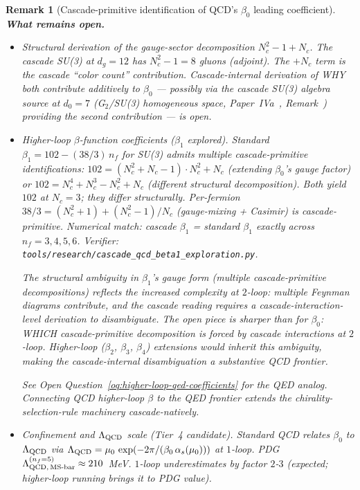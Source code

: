 \documentclass[12pt,a4paper]{article}
\newtheorem*{remark}{Remark}
\begin{document}
\begin{remark}[Cascade-primitive identification of QCD's $\beta_0$ leading coefficient]
\medskip\noindent\textbf{What remains open.}
\begin{itemize}[nosep]
\item \emph{Structural derivation of the gauge-sector decomposition
$N_c^2 - 1 + N_c$.} The cascade SU(3) at $d_g = 12$ has $N_c^2 - 1 = 8$
gluons (adjoint). The $+N_c$ term is the cascade ``color count''
contribution. Cascade-internal derivation of WHY both contribute
additively to $\beta_0$ — possibly via the cascade SU(3) algebra source
at $d_0 = 7$ (G$_2$/SU(3) homogeneous space, Paper~IVa~\cite{part4a}, Remark~)
providing the second contribution — is open.
\item \emph{Higher-loop $\beta$-function coefficients ($\beta_1$
explored).} Standard $\beta_1 = 102 - (38/3)\,n_f$ for SU(3) admits
\emph{multiple} cascade-primitive identifications: $102 =
(N_c^2 + N_c - 1)\cdot N_c^2 + N_c$ (extending $\beta_0$'s gauge factor)
\emph{or} $102 = N_c^4 + N_c^3 - N_c^2 + N_c$ (different structural
decomposition). Both yield $102$ at $N_c = 3$; they differ structurally.
Per-fermion $38/3 = (N_c^2 + 1) + (N_c^2 - 1)/N_c$ (gauge-mixing +
Casimir) is cascade-primitive. Numerical match: cascade $\beta_1$ =
standard $\beta_1$ exactly across $n_f = 3, 4, 5, 6$. Verifier:
\texttt{tools/research/cascade\_qcd\_beta1\_exploration.py}.

The structural ambiguity in $\beta_1$'s gauge form (multiple
cascade-primitive decompositions) reflects the increased complexity at
$2$-loop: multiple Feynman diagrams contribute, and the cascade reading
requires a cascade-interaction-level derivation to disambiguate. The
open piece is sharper than for $\beta_0$: WHICH cascade-primitive
decomposition is forced by cascade interactions at $2$-loop. Higher-loop
($\beta_2$, $\beta_3$, $\beta_4$) extensions would inherit this ambiguity,
making the cascade-internal disambiguation a substantive QCD frontier.

See Open Question~\ref{oq:higher-loop-qed-coefficients} for the QED
analog. Connecting QCD higher-loop $\beta$ to the QED frontier extends
the chirality-selection-rule machinery cascade-natively.
\item \emph{Confinement and $\Lambda_{\rm QCD}$ scale (Tier~4 candidate).}
Standard QCD relates $\beta_0$ to $\Lambda_{\rm QCD}$ via
$\Lambda_{\rm QCD} = \mu_0\,\exp(-2\pi/(\beta_0\,\alpha_s(\mu_0)))$ at
$1$-loop. PDG $\Lambda_{{\rm QCD},\,{\rm MS\text{-}bar}}^{(n_f=5)} \approx 210$~MeV.
$1$-loop underestimates by factor $2$-$3$ (expected; higher-loop running
brings it to PDG value).


\end{itemize}
\end{remark}
\end{document}
